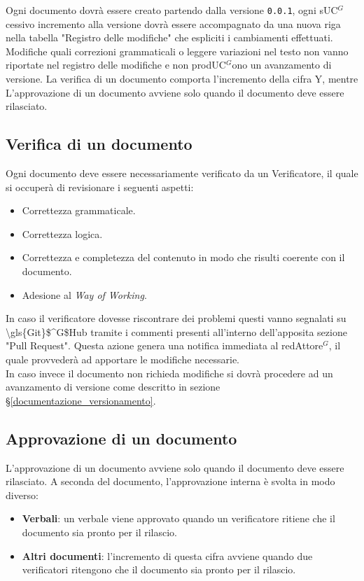 Ogni documento dovrà essere creato partendo dalla versione \texttt{0.0.1}, ogni
s\gls{UC}$^G$cessivo incremento alla versione dovrà essere accompagnato da una nuova riga
nella tabella "Registro delle modifiche" che espliciti i cambiamenti effettuati.
Modifiche quali correzioni grammaticali o leggere variazioni nel testo non vanno
riportate nel registro delle modifiche e non prod\gls{UC}$^G$ono un avanzamento di
versione.
La verifica di un documento comporta l'incremento della cifra Y, mentre
L'approvazione di un documento avviene solo quando il documento deve essere
rilasciato.

\subsection{Verifica di un documento}
Ogni documento deve essere necessariamente verificato da un Verificatore, il
quale si occuperà di revisionare i seguenti aspetti:
\begin{itemize}
	\item Correttezza grammaticale.
	\item Correttezza logica.
	\item Correttezza e completezza del contenuto in modo che risulti coerente
	      con il documento.
	\item Adesione al \textit{Way of Working}.
\end{itemize}
\noindent
In caso il verificatore dovesse riscontrare dei problemi questi vanno segnalati
su \gls{\gls{Git}$^G$Hub} tramite i commenti presenti all'interno dell'apposita sezione
"Pull Request".
Questa azione genera una notifica immediata al red\gls{Attore}$^G$, il quale provvederà
ad apportare le modifiche necessarie. \\
In caso invece il documento non richieda modifiche si dovrà procedere ad un
avanzamento di versione come descritto in sezione
\S\ref{documentazione_versionamento}.


\subsection{Approvazione di un documento}
L'approvazione di un documento avviene solo quando il documento deve essere
rilasciato. A seconda del documento, l'approvazione interna è svolta in modo
diverso:
\begin{itemize}
	\item \textbf{Verbali}: un verbale viene approvato quando un verificatore
	      ritiene che il documento sia pronto per il rilascio.

	\item \textbf{Altri documenti}: l'incremento di questa cifra avviene
	      quando due verificatori ritengono che il documento sia pronto per il
	      rilascio.
\end{itemize}


